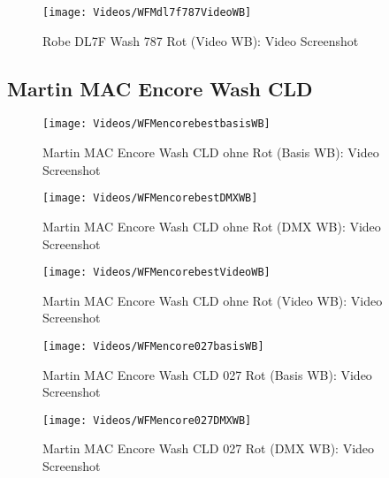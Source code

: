\documentclass[pagesize,paper=A4,fontsize=12pt,utf8,numbers=noenddot,bibliography=totoc,listof=totoc,DIV=11,BCOR=1mm]{scrreprt}
\begin{document}
\begin{figure}[htp]     %
\centering
\texttt{[image: Videos/WFMdl7f787VideoWB]} 
\caption {Robe DL7F Wash 787 Rot (Video WB): Video Screenshot} 
\end{figure}


\subsection{Martin MAC Encore Wash CLD}

\begin{figure}[htp]     %
\centering
\texttt{[image: Videos/WFMencorebestbasisWB]} 
\caption {Martin MAC Encore Wash CLD ohne Rot (Basis WB): Video Screenshot} 
\end{figure}

\begin{figure}[htp]     %
\centering
\texttt{[image: Videos/WFMencorebestDMXWB]} 
\caption {Martin MAC Encore Wash CLD ohne Rot (DMX WB): Video Screenshot} 
\end{figure}

\begin{figure}[htp]     %
\centering
\texttt{[image: Videos/WFMencorebestVideoWB]} 
\caption {Martin MAC Encore Wash CLD ohne Rot (Video WB): Video Screenshot} 
\end{figure}



\begin{figure}[htp]     %
\centering
\texttt{[image: Videos/WFMencore027basisWB]} 
\caption {Martin MAC Encore Wash CLD 027 Rot (Basis WB): Video Screenshot} 
\end{figure}

\begin{figure}[htp]     %
\centering
\texttt{[image: Videos/WFMencore027DMXWB]} 
\caption {Martin MAC Encore Wash CLD 027 Rot (DMX WB): Video Screenshot} 
\end{figure}
\end{document}
